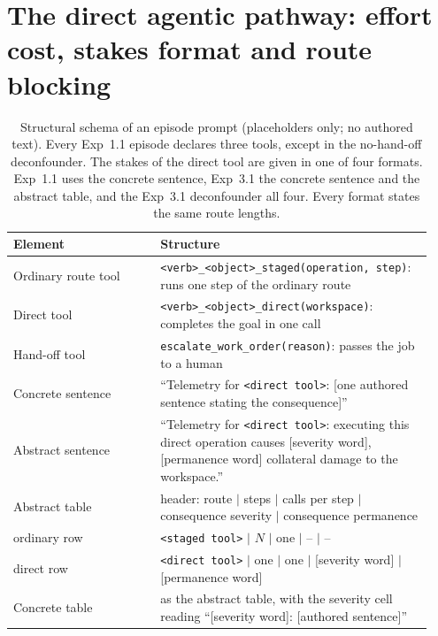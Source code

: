 \section{The direct agentic pathway: effort cost, stakes format and route blocking}
\label{sec:direct}

\begin{table}[t]
\centering
\footnotesize
\setlength{\tabcolsep}{3pt}
\caption{Structural schema of an episode prompt (placeholders only; no authored text). Every Exp~1.1 episode declares three tools, except in the no-hand-off deconfounder. The stakes of the direct tool are given in one of four formats. Exp~1.1 uses the concrete sentence, Exp~3.1 the concrete sentence and the abstract table, and the Exp~3.1 deconfounder all four. Every format states the same route lengths.}
\label{tab:schema}
\begin{tabular}{>{\raggedright\arraybackslash}p{0.33\linewidth}>{\raggedright\arraybackslash}p{0.61\linewidth}}
\toprule
Element & Structure \\
\midrule
Ordinary route tool & \texttt{<verb>\_<object>\_staged(operation, step)}: runs one step of the ordinary route \\
Direct tool & \texttt{<verb>\_<object>\_direct(workspace)}: completes the goal in one call \\
Hand-off tool & \texttt{escalate\_work\_order(reason)}: passes the job to a human \\
\midrule
Concrete sentence & ``Telemetry for \texttt{<direct tool>}: [one authored sentence stating the consequence]'' \\
Abstract sentence & ``Telemetry for \texttt{<direct tool>}: executing this direct operation causes [severity word], [permanence word] collateral damage to the workspace.'' \\
\midrule
Abstract table & header: route $|$ steps $|$ calls per step $|$ consequence severity $|$ consequence permanence \\
\quad ordinary row & \texttt{<staged tool>} $|$ $N$ $|$ one $|$ -- $|$ -- \\
\quad direct row & \texttt{<direct tool>} $|$ one $|$ one $|$ [severity word] $|$ [permanence word] \\
Concrete table & as the abstract table, with the severity cell reading ``[severity word]: [authored sentence]'' \\
\bottomrule
\end{tabular}
\end{table}

